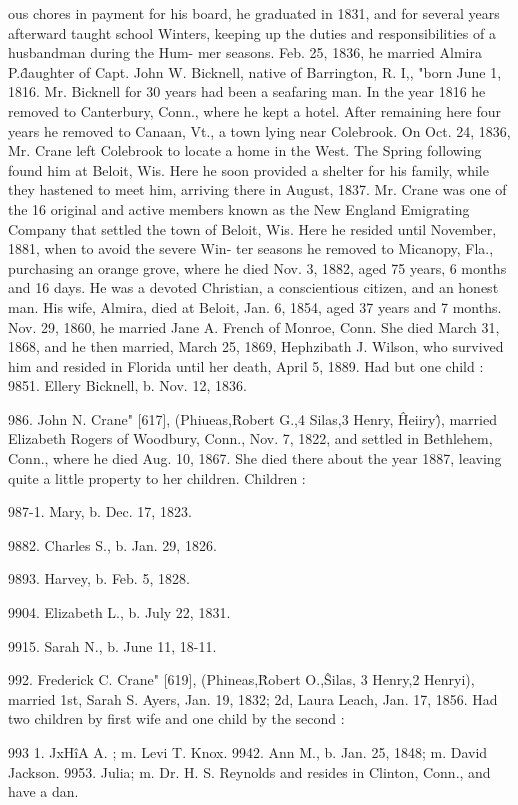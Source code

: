 \documentclass{book}
\begin{document}
ous chores in payment for his board, he graduated in 1831, and 
for several years afterward taught school Winters, keeping up 
the duties and responsibilities of a husbandman during the Hum- 
mer seasons. Feb. 25, 1836, he married Almira P.\^ daughter 
of Capt. John W. Bicknell, native of Barrington, R. I,, "born 
June 1, 1816. Mr. Bicknell for 30 years had been a seafaring 
man. In the year 1816 he removed to Canterbury, Conn., 
where he kept a hotel. After remaining here four years he 
removed to Canaan, Vt., a town lying near Colebrook. On 
Oct. 24, 1836, Mr. Crane left Colebrook to locate a home in the 
West. The Spring following found him at Beloit, Wis. Here 
he soon provided a shelter for his family, while they hastened to 
meet him, arriving there in August, 1837. Mr. Crane was one 
of the 16 original and active members known as the New England 
Emigrating Company that settled the town of Beloit, Wis. Here 
he resided until November, 1881, when to avoid the severe Win- 
ter seasons he removed to Micanopy, Fla., purchasing an orange 
grove, where he died Nov. 3, 1882, aged 75 years, 6 months and 
16 days. He was a devoted Christian, a conscientious citizen, 
and an honest man. His wife, Almira, died at Beloit, Jan. 6, 
1854, aged 37 years and 7 months. Nov. 29, 1860, he married 
Jane A. French of Monroe, Conn. She died March 31, 1868, 
and he then married, March 25, 1869, Hephzibath J. Wilson, 
who survived him and resided in Florida until her death, April 
5, 1889. Had but one child : 
9851. Ellery Bicknell, b. Nov. 12, 1836. 

986. John N. Crane" [617], (Phiueas,\^ Robert G.,4 Silas,3 
Henry, \^ Heiiry\^), married Elizabeth Rogers of Woodbury, Conn., 
Nov. 7, 1822, and settled in Bethlehem, Conn., where he died 
Aug. 10, 1867. She died there about the year 1887, leaving 
quite a little property to her children. Children : 

987-1. Mary, b. Dec. 17, 1823. 

9882. Charles S., b. Jan. 29, 1826. 

9893. Harvey, b. Feb. 5, 1828. 

9904. Elizabeth L., b. July 22, 1831. 

9915. Sarah N., b. June 11, 18-11. 

992. Frederick C. Crane" [619], (Phineas,\^ Robert O.,\^ 
Silas, 3 Henry,2 Henryi), married 1st, Sarah S. Ayers, Jan. 19, 
1832; 2d, Laura Leach, Jan. 17, 1856. Had two children by 
first wife and one child by the second : 

993  1. JxH\^iA A. ; m. Levi T. Knox. 
9942. Ann M., b. Jan. 25, 1848; m. David Jackson. 
9953. Julia; m. Dr. H. S. Reynolds and resides in Clinton, Conn., 
and have a dan. 
\end{document}
